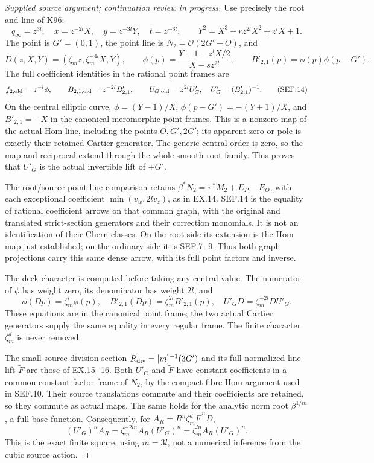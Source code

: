 \begin{proof}[Supplied source argument; continuation review in progress]
Use precisely the root and line of K96:
\[
 q_\infty=z^{3l},\quad
 x=z^{-2l}X,\quad y=z^{-3l}Y,\quad t=z^{-3l},\qquad
 Y^2=X^3+r z^{2l}X^2+z^lX+1.
 \tag{SEF.12}
\]
The point is \(G'=(0,1)\), the point line is \(N_2=\mathcal O(2G'-O)\),
and
\[
 D(z,X,Y)=(\zeta_m z,\zeta_m^{-4l}X,Y),\qquad
 \phi(p)=\frac{Y-1-z^lX/2}{X-sz^{2l}},\qquad
 B'_{2,1}(p)=\phi(p)\phi(p-G').
 \tag{SEF.13}
\]
The full coefficient identities in the rational point frames are
\[
 f_{2,\rm old}=z^{-l}\phi,\qquad
 B_{2,1,\rm old}=z^{-2l}B'_{2,1},\qquad
 U_{G,\rm old}=z^{2l}U'_G,\quad U'_G=(B'_{2,1})^{-1}.
 \tag{SEF.14}
\]
On the central elliptic curve, \(\phi=(Y-1)/X\),
\(\phi(p-G')=-(Y+1)/X\), and \(B'_{2,1}=-X\) in the
canonical meromorphic point frames. This is a nonzero map of the
actual Hom line, including the points \(O,G',2G'\); its apparent
zero or pole is exactly their retained Cartier generator. The
generic central order is zero, so the map and reciprocal extend
through the whole smooth root family. This proves that \(U'_G\)
is the actual invertible lift of \(+G'\).

The root/source point-line comparison retains
\(\beta^*N_2=\pi^*M_2+E_P-E_O\), with each exceptional coefficient
\(\min(v_w,2l v_z)\), as in EX.14. SEF.14 is the equality of
rational coefficient arrows on that common graph, with the original
and translated strict-section generators and their correction
monomials. It is not an identification of their Chern classes. On
the root side its extension is the Hom map just established; on the
ordinary side it is SEF.7-\/-9. Thus both graph projections carry this
same dense arrow, with its full point factors and inverse.

The deck character is computed before taking any central value.
The numerator of \(\phi\) has weight zero, its denominator has
weight \(2l\), and
\[
 \phi(Dp)=\zeta_m^l\phi(p),\quad
 B'_{2,1}(Dp)=\zeta_m^{2l}B'_{2,1}(p),\quad
                    U'_G D=\zeta_m^{-2l}D U'_G.
 \tag{SEF.15}
\]
These equations are in the canonical point frame; the two actual
Cartier generators supply the same equality in every regular
frame. The finite character \(\zeta_m^d\) is never removed.

The small source division section \(R_{\rm div}=[m]^{-1}(3G')\)
and its full normalized line lift \(\widetilde F\) are those of
EX.15-\/-16. Both \(U'_G\) and \(\widetilde F\) have constant
coefficients in a common constant-factor frame of \(N_2\), by the
compact-fibre Hom argument used in SEF.10. Their source
translations commute and their coefficients are retained, so
they commute as actual maps. The same holds for the analytic
norm root \(\beta^{1/m}\), a full base function. Consequently,
for \(A_R=R^n\zeta_m^d\widetilde F^{\,n}D\),
\[
 (U'_G)^n A_R
       =\zeta_m^{-2ln} A_R(U'_G)^n
       =\zeta_m^{ln} A_R(U'_G)^n .
 \tag{SEF.16}
\]
This is the exact finite square, using \(m=3l\), not a numerical
inference from the cubic source action.


\end{proof}
